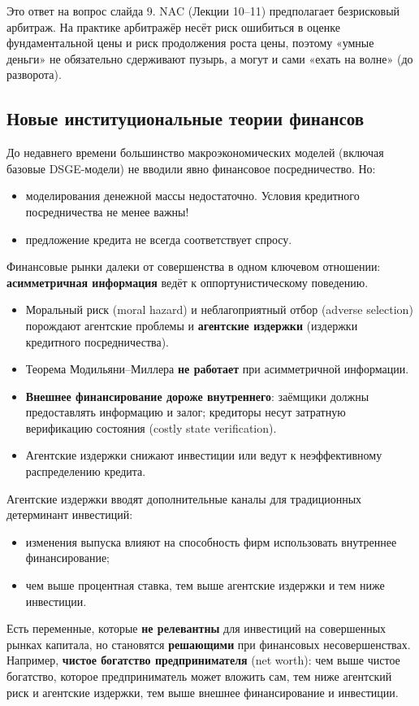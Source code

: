 \documentclass[10pt,a4paper]{article}
\begin{document}
\begin{intuition}
Это ответ на вопрос слайда 9. NAC (Лекции 10--11) предполагает безрисковый арбитраж. На практике арбитражёр несёт риск ошибиться в оценке фундаментальной цены и риск продолжения роста цены, поэтому «умные деньги» не обязательно сдерживают пузырь, а могут и сами «ехать на волне» (до разворота).
\end{intuition}

\subsection{Новые институциональные теории финансов}

До недавнего времени большинство макроэкономических моделей (включая базовые DSGE-модели) не вводили явно финансовое посредничество. Но:
\begin{itemize}[leftmargin=1.3em]
\item моделирования денежной массы недостаточно. Условия кредитного посредничества не менее важны!
\item предложение кредита не всегда соответствует спросу.
\end{itemize}

Финансовые рынки далеки от совершенства в одном ключевом отношении: \textbf{асимметричная информация} ведёт к оппортунистическому поведению.
\begin{itemize}[leftmargin=1.3em]
\item Моральный риск (moral hazard) и неблагоприятный отбор (adverse selection) порождают агентские проблемы и \textbf{агентские издержки} (издержки кредитного посредничества).
\item Теорема Модильяни--Миллера \textbf{не работает} при асимметричной информации.
\item \textbf{Внешнее финансирование дороже внутреннего}: заёмщики должны предоставлять информацию и залог; кредиторы несут затратную верификацию состояния (costly state verification).
\item Агентские издержки снижают инвестиции или ведут к неэффективному распределению кредита.
\end{itemize}

Агентские издержки вводят дополнительные каналы для традиционных детерминант инвестиций:
\begin{itemize}[leftmargin=1.3em]
\item изменения выпуска влияют на способность фирм использовать внутреннее финансирование;
\item чем выше процентная ставка, тем выше агентские издержки и тем ниже инвестиции.
\end{itemize}
Есть переменные, которые \textbf{не релевантны} для инвестиций на совершенных рынках капитала, но становятся \textbf{решающими} при финансовых несовершенствах. Например, \textbf{чистое богатство предпринимателя} (net worth): чем выше чистое богатство, которое предприниматель может вложить сам, тем ниже агентский риск и агентские издержки, тем выше внешнее финансирование и инвестиции.
\end{document}
